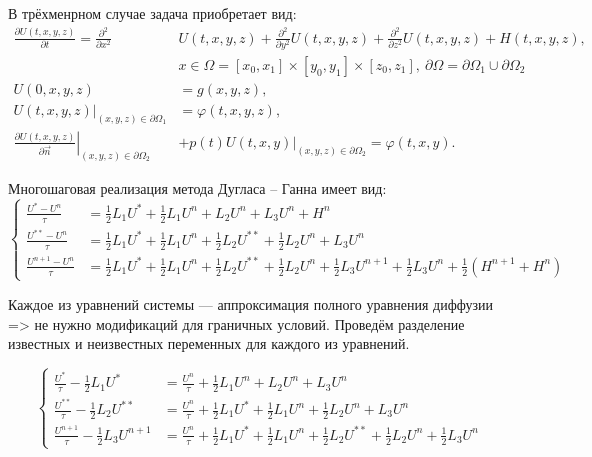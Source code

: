 \documentclass[a4paper,12pt]{article}
\begin{document}
В трёхменрном случае задача приобретает вид:
\begin{align}
  \label{eq:3d-problem-eq}
  \frac{\partial U(t,x,y,z)}{\partial t} = \frac{\partial^2}{\partial x^2} &U(t,x,y,z) + \frac{\partial^2}{\partial y^2} U(t,x,y,z) + \frac{\partial^2}{\partial z^2} U(t,x,y,z) + H(t,x,y,z),\\
                                         &x \in \Omega = [x_0,x_1] \times [y_0, y_1] \times [z_0, z_1], \ \partial \Omega = \partial \Omega_1 \cup \partial \Omega_2 \\
  \label{eq:3d-problem-ic}
  U(0, x, y, z) &= g(x, y, z),\\
  \label{eq:3d-problem-bc1}
  \left. U(t,x,y,z) \right|_{(x,y,z) \in \partial \Omega_1} &=  \varphi(t, x,y,z),   \\
  \label{eq:3d-problem-bc3}
  \left. \frac{\partial U(t,x,y,z) }{\partial \vec n} \right|_{(x,y,z) \in \partial \Omega_2}& +
                                                                                               p(t)\left. U(t,x,y) \right|_{(x,y,z) \in \partial \Omega_2}  = \varphi(t, x, y).
\end{align}

Многошаговая реализация метода Дугласа -- Ганна имеет вид:
\begin{equation*}
  \begin{cases}
    \frac{U^{*}   - U^n}{\tau} &= \frac{1}{2} L_1 U^{*}  + \frac{1}{2} L_1 U^n +  L_2 U^n +  L_3 U^n + H^n\\
    \frac{U^{**}  - U^n}{\tau} &= \frac{1}{2} L_1 U^{*}  + \frac{1}{2} L_1 U^n +
    \frac{1}{2} L_2 U^{**} + \frac{1}{2} L_2 U^n + L_3 U^n \\
    \frac{U^{n+1} - U^n}{\tau} &= \frac{1}{2} L_1 U^{*}   + \frac{1}{2} L_1 U^n +
    \frac{1}{2} L_2 U^{**}  + \frac{1}{2} L_2 U^n +
    \frac{1}{2} L_3 U^{n+1} + \frac{1}{2} L_3 U^n +
    \frac{1}{2} \left( H^{n+1} + H^{n} \right)
  \end{cases}
\end{equation*}

Каждое из уравнений системы --- аппроксимация полного уравнения диффузии => не нужно модификаций для граничных условий.
Проведём разделение известных и неизвестных переменных для каждого из уравнений.

\begin{equation*}
  \begin{cases}
    \frac{U^{*}}{\tau}  - \frac{1}{2} L_1 U^{*} &= \frac{U^n}{\tau} + \frac{1}{2} L_1 U^n +  L_2 U^n +  L_3 U^n \\
    \frac{U^{**}}{\tau} - \frac{1}{2} L_2 U^{**} &= \frac{U^n}{\tau} + \frac{1}{2} L_1 U^{*}  + \frac{1}{2} L_1 U^n + \frac{1}{2} L_2 U^n + L_3 U^n \\
    \frac{U^{n+1}}{\tau} - \frac{1}{2} L_3 U^{n+1} &= \frac{U^n}{\tau} + \frac{1}{2} L_1 U^{*}   + \frac{1}{2} L_1 U^n + \frac{1}{2} L_2 U^{**}  + \frac{1}{2} L_2 U^n + \frac{1}{2} L_3 U^n
  \end{cases}
\end{equation*}
\end{document}
